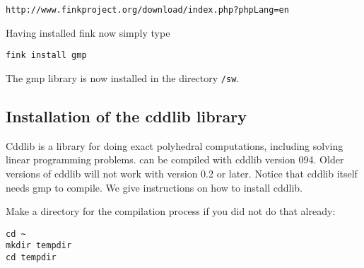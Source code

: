 \centerline{\tt http://www.finkproject.org/download/index.php?phpLang=en}

\noindent
Having installed fink now simply type
\begin{verbatim}
fink install gmp
\end{verbatim}
The gmp library is now installed in the directory {\tt /sw}.

\subsection{Installation of the cddlib library}
Cddlib \cite{cdd} is a library for doing exact polyhedral
computations, including solving linear programming problems. \name can
be compiled with cddlib version 094. Older versions of cddlib will not
work with \name version 0.2 or later.
Notice that cddlib itself needs gmp to compile. We give
instructions on how to install cddlib.

\vspace{0.3cm}

\noindent
\color{red}
Make a directory for the compilation process if you did not do that already:
\begin{verbatim}
cd ~
mkdir tempdir
cd tempdir
\end{verbatim}

